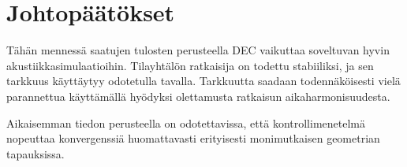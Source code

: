 \documentclass[utf8]{gradu3}
\begin{document}
\chapter{Johtopäätökset}

Tähän mennessä saatujen tulosten perusteella
DEC vaikuttaa soveltuvan hyvin akustiikkasimulaatioihin.
Tilayhtälön ratkaisija on todettu stabiiliksi,
ja sen tarkkuus käyttäytyy odotetulla tavalla.
Tarkkuutta saadaan todennäköisesti vielä parannettua
käyttämällä hyödyksi olettamusta ratkaisun aikaharmonisuudesta.

Aikaisemman tiedon perusteella on odotettavissa,
että kontrollimenetelmä nopeuttaa konvergenssiä huomattavasti
erityisesti monimutkaisen geometrian tapauksissa.

\printbibliography
\end{document}
